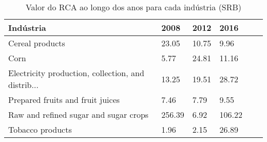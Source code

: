 \begin{table}
\centering
\caption{Valor do RCA ao longo dos anos para cada indústria (SRB)}
\begin{tabular}{p{6cm}p{1.5cm}p{1.5cm}p{1.5cm}p{1.5cm}p{1.5cm}}
\toprule
                                         Indústria &   2008 &  2012 &   2016 \\
\midrule
                                   Cereal products &  23.05 & 10.75 &   9.96 \\
                                              Corn &   5.77 & 24.81 &  11.16 \\
Electricity production, collection, and distrib... &  13.25 & 19.51 &  28.72 \\
                  Prepared fruits and fruit juices &   7.46 &  7.79 &   9.55 \\
             Raw and refined sugar and sugar crops & 256.39 &  6.92 & 106.22 \\
                                  Tobacco products &   1.96 &  2.15 &  26.89 \\
\bottomrule
\end{tabular}
\end{table}

